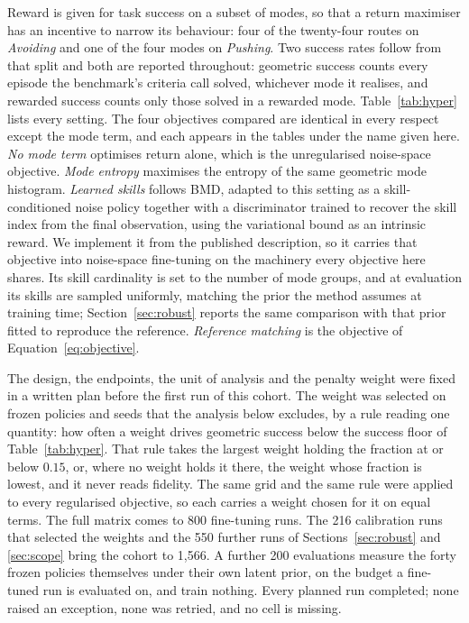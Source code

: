 \documentclass[preprint,12pt]{elsarticle}
\begin{document}
Reward is given for task success on a subset of modes, so that a return maximiser
has an incentive to narrow its behaviour: four of the twenty-four routes on
\emph{Avoiding} and one of the four modes on \emph{Pushing}. Two success rates
follow from that split and both are reported throughout: geometric success
counts every episode the benchmark's criteria call solved, whichever mode it
realises, and rewarded success counts only those solved in a rewarded mode.
Table~\ref{tab:hyper} lists every setting. The four objectives compared are
identical in every respect except the mode term, and each appears in the tables
under the name given here. \emph{No mode term} optimises return alone, which is the unregularised
noise-space objective. \emph{Mode entropy} maximises the entropy of the same
geometric mode histogram. \emph{Learned skills} follows
BMD, adapted to this setting as a skill-conditioned noise policy together with a
discriminator trained to recover the skill index from the final observation,
using the variational bound as an intrinsic reward. We implement it from the
published description, so it carries that objective into noise-space
fine-tuning on the machinery every objective here shares. Its skill cardinality is set
to the number of mode groups, and at evaluation its skills are sampled uniformly,
matching the prior the method assumes at training time;
Section~\ref{sec:robust} reports the same comparison with that prior fitted to
reproduce the reference. \emph{Reference matching} is the objective of
Equation~\ref{eq:objective}.

The design, the endpoints, the unit of analysis and the penalty weight were
fixed in a written plan before the first run of this cohort. The weight was
selected on frozen policies and seeds that the analysis below excludes, by a
rule reading one quantity: how often a weight drives geometric success below
the success floor of Table~\ref{tab:hyper}. That rule takes the largest weight
holding the fraction at or below $0.15$, or, where no weight holds it there,
the weight whose fraction is lowest, and it never reads fidelity. The same grid
and the same rule were applied to every regularised objective, so each carries
a weight chosen for it on equal terms. The full matrix comes to 800
fine-tuning runs. The 216 calibration runs that selected the weights and the
550 further runs of Sections~\ref{sec:robust} and \ref{sec:scope} bring the
cohort to 1{,}566. A further 200 evaluations measure
the forty frozen policies themselves under their own latent prior, on the
budget a fine-tuned run is evaluated on, and train nothing. Every planned run
completed; none raised an exception, none was retried, and no cell is missing.
\end{document}
